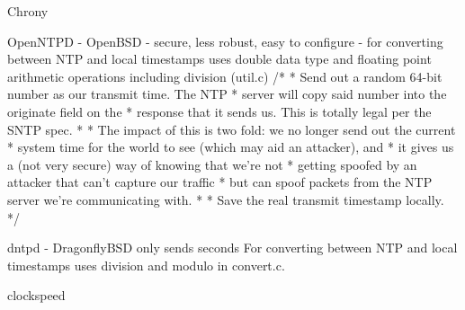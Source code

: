 Chrony

OpenNTPD - OpenBSD - secure, less robust, easy to configure - for converting between NTP and local timestamps uses double
data type and floating point arithmetic operations including division (util.c)
	/*
	 * Send out a random 64-bit number as our transmit time.  The NTP
	 * server will copy said number into the originate field on the
	 * response that it sends us.  This is totally legal per the SNTP spec.
	 *
	 * The impact of this is two fold: we no longer send out the current
	 * system time for the world to see (which may aid an attacker), and
	 * it gives us a (not very secure) way of knowing that we're not
	 * getting spoofed by an attacker that can't capture our traffic
	 * but can spoof packets from the NTP server we're communicating with.
	 *
	 * Save the real transmit timestamp locally.
	 */

dntpd - DragonflyBSD
only sends seconds
For converting between NTP and local timestamps uses division and modulo in convert.c.


clockspeed
